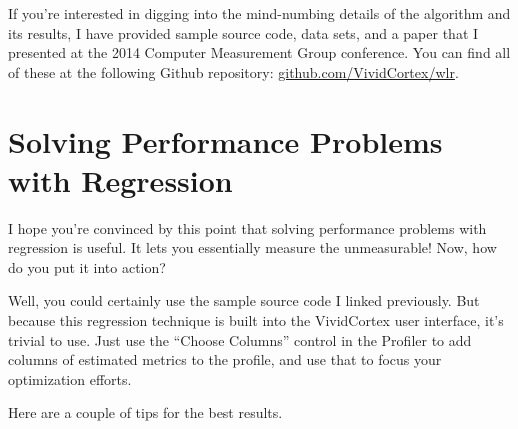 \documentclass{vivid_layout}
\begin{document}
If you're interested in digging into the mind-numbing details of the algorithm and its results, I have provided sample source code, data sets, and a paper that I presented at the 2014 Computer Measurement Group conference. You can find all of these at the following Github repository: \href{https://github.com/VividCortex/wlr}{github.com/VividCortex/wlr}.

\section{Solving Performance Problems with Regression}

I hope you're convinced by this point that solving performance problems with
regression is useful. It lets you essentially measure the unmeasurable! Now, how
do you put it into action?

Well, you could certainly use the sample source code I linked previously. But
because this regression technique is built into the VividCortex user interface,
it's trivial to use. Just use the ``Choose Columns'' control in the Profiler to
add columns of estimated metrics to the profile, and use that to focus your optimization
efforts.

Here are a couple of tips for the best results.
\end{document}
